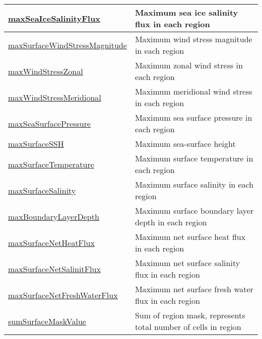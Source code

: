 {\begin{center}
\begin{longtable}{| p{2.0in} | p{4.0in} |}
    \hline
    \hyperref[subsec:var_sec_surfaceAreaWeightedAveragesAM_maxSeaIceSalinityFlux]{maxSeaIceSalinityFlux} & Maximum sea ice salinity flux in each region \\
    \hline
    \hyperref[subsec:var_sec_surfaceAreaWeightedAveragesAM_maxSurfaceWindStressMagnitude]{maxSurfaceWindStressMagnitude} & Maximum wind stress magnitude in each region \\
    \hline
    \hyperref[subsec:var_sec_surfaceAreaWeightedAveragesAM_maxWindStressZonal]{maxWindStressZonal} & Maximum zonal wind stress in each region \\
    \hline
    \hyperref[subsec:var_sec_surfaceAreaWeightedAveragesAM_maxWindStressMeridional]{maxWindStressMeridional} & Maximum meridional wind stress in each region \\
    \hline
    \hyperref[subsec:var_sec_surfaceAreaWeightedAveragesAM_maxSeaSurfacePressure]{maxSeaSurfacePressure} & Maximum sea surface pressure in each region \\
    \hline
    \hyperref[subsec:var_sec_surfaceAreaWeightedAveragesAM_maxSurfaceSSH]{maxSurfaceSSH} & Maximum sea-surface height \\
    \hline
    \hyperref[subsec:var_sec_surfaceAreaWeightedAveragesAM_maxSurfaceTemperature]{maxSurfaceTemperature} & Maximum surface temperature in each region \\
    \hline
    \hyperref[subsec:var_sec_surfaceAreaWeightedAveragesAM_maxSurfaceSalinity]{maxSurfaceSalinity} & Maximum surface salinity in each region \\
    \hline
    \hyperref[subsec:var_sec_surfaceAreaWeightedAveragesAM_maxBoundaryLayerDepth]{maxBoundaryLayerDepth} & Maximum surface boundary layer depth in each region \\
    \hline
    \hyperref[subsec:var_sec_surfaceAreaWeightedAveragesAM_maxSurfaceNetHeatFlux]{maxSurfaceNetHeatFlux} & Maximum net surface heat flux in each region \\
    \hline
    \hyperref[subsec:var_sec_surfaceAreaWeightedAveragesAM_maxSurfaceNetSalinitFlux]{maxSurfaceNetSalinitFlux} & Maximum net surface salinity flux in each region \\
    \hline
    \hyperref[subsec:var_sec_surfaceAreaWeightedAveragesAM_maxSurfaceNetFreshWaterFlux]{maxSurfaceNetFreshWaterFlux} & Maximum net surface fresh water flux in each region \\
    \hline
    \hyperref[subsec:var_sec_surfaceAreaWeightedAveragesAM_sumSurfaceMaskValue]{sumSurfaceMaskValue} & Sum of region mask, represents total number of cells in region \\

\end{longtable}
\end{center}}
